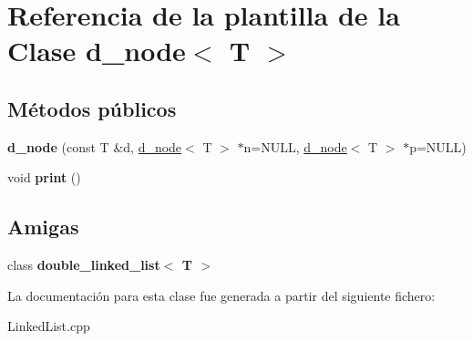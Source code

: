 \hypertarget{classd__node}{}\section{Referencia de la plantilla de la Clase d\+\_\+node$<$ T $>$}
\label{classd__node}
\subsection*{Métodos públicos}
\begin{DoxyCompactItemize}
\item 
\mbox{\label{classd__node_abaeebcef6100d03af4ebf6bfb52e8e0f}} 
{\bfseries d\+\_\+node} (const T \&d, \hyperlink{classd__node}{d\+\_\+node}$<$ T $>$ $\ast$n=N\+U\+LL, \hyperlink{classd__node}{d\+\_\+node}$<$ T $>$ $\ast$p=N\+U\+LL)
\item 
\mbox{\label{classd__node_a7846e603daf1d89268084e5be3005719}} 
void {\bfseries print} ()
\end{DoxyCompactItemize}
\subsection*{Amigas}
\begin{DoxyCompactItemize}
\item 
\mbox{\label{classd__node_a45e00b04588b8ef146ed1c10af00ae9c}} 
class {\bfseries double\+\_\+linked\+\_\+list$<$ T $>$}
\end{DoxyCompactItemize}


La documentación para esta clase fue generada a partir del siguiente fichero\+:\begin{DoxyCompactItemize}
\item 
Linked\+List.\+cpp\end{DoxyCompactItemize}
